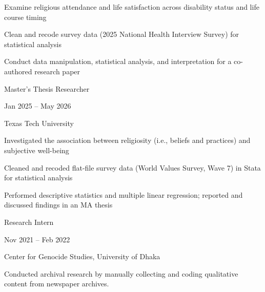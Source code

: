 \documentclass[letterpaper,10pt]{article}
\begin{document}
    \begin{description} [font=$\bullet$]
    \item{Examine religious attendance and life satisfaction across disability status and life course timing}
    \item{Clean and recode survey data (2025 National Health Interview Survey) for statistical analysis}
    \item{Conduct data manipulation, statistical analysis, and interpretation for a co-authored research paper}
    \end{description} 
    \vspace{0.65em}

    
    \begin{minipage} {.75\linewidth}
        \begin{flushleft}
            Master’s Thesis Researcher
        \end{flushleft}
    \end{minipage}
    \hfill
    \begin{minipage} {.20\linewidth}
        \begin{flushright}
            Jan 2025 – May 2026
        \end{flushright}
    \end{minipage}
    Texas Tech University \\

    \begin{description} [font=$\bullet$]
    \item{Investigated the association between religiosity (i.e., beliefs and practices) and subjective well-being}
    \item {Cleaned and recoded flat-file survey data (World Values Survey, Wave 7) in Stata for statistical analysis}
    \item {Performed descriptive statistics and multiple linear regression; reported and discussed findings in an MA thesis}
    \end{description} 
    \vspace{0.65em}

    
    \begin{minipage} {.75\linewidth}
        \begin{flushleft}
            Research Intern
        \end{flushleft}
    \end{minipage}
    \hfill
    \begin{minipage} {.20\linewidth}
        \begin{flushright}
            Nov 2021 – Feb 2022
        \end{flushright}
    \end{minipage}
    Center for Genocide Studies, University of Dhaka \\
    \begin{description} [font=$\bullet$]
    \item Conducted archival research by manually collecting and coding qualitative content from newspaper archives.
    \end{description}
    \vspace{0.65em}
\end{document}
